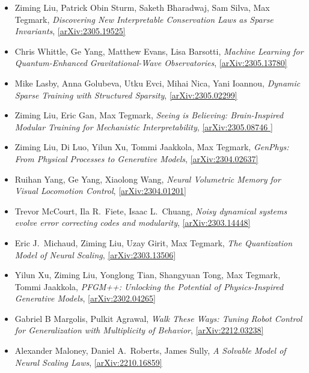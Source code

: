 \begin{itemize}
\item Ziming Liu, Patrick Obin Sturm, Saketh Bharadwaj, Sam Silva, Max Tegmark, \textit{Discovering New Interpretable Conservation Laws as Sparse Invariants}, \href{https://arxiv.org/abs/2305.19525}{[arXiv:2305.19525]} 
\item Chris Whittle, Ge Yang, Matthew Evans, Lisa Barsotti, \textit{Machine Learning for Quantum-Enhanced Gravitational-Wave Observatories}, \href{https://arxiv.org/abs/2305.13780}{[arXiv:2305.13780]} 
\item Mike Lasby, Anna Golubeva, Utku Evci, Mihai Nica, Yani Ioannou, \textit{Dynamic Sparse Training with Structured Sparsity}, \href{https://arxiv.org/abs/2305.02299}{[arXiv:2305.02299]} 
\item Ziming Liu, Eric Gan, Max Tegmark, \textit{Seeing is Believing: Brain-Inspired Modular Training for Mechanistic Interpretability}, \href{https://arxiv.org/abs/2305.08746 }{[arXiv:2305.08746 ]} 
\item Ziming Liu, Di Luo, Yilun Xu, Tommi Jaakkola, Max Tegmark, \textit{GenPhys: From Physical Processes to Generative Models}, \href{https://arxiv.org/abs/2304.02637}{[arXiv:2304.02637]} 
\item Ruihan Yang, Ge Yang, Xiaolong Wang, \textit{Neural Volumetric Memory for Visual Locomotion Control}, \href{https://arxiv.org/abs/2304.01201}{[arXiv:2304.01201]} 
\item Trevor McCourt, Ila R.\  Fiete, Isaac L.\  Chuang, \textit{Noisy dynamical systems evolve error correcting codes and modularity}, \href{https://arxiv.org/abs/2303.14448}{[arXiv:2303.14448]} 
\item Eric J.\  Michaud, Ziming Liu, Uzay Girit, Max Tegmark, \textit{The Quantization Model of Neural Scaling}, \href{https://arxiv.org/abs/2303.13506}{[arXiv:2303.13506]} 
\item Yilun Xu, Ziming Liu, Yonglong Tian, Shangyuan Tong, Max Tegmark, Tommi Jaakkola, \textit{PFGM++: Unlocking the Potential of Physics-Inspired Generative Models}, \href{https://arxiv.org/abs/2302.04265}{[arXiv:2302.04265]} 
\item Gabriel B Margolis, Pulkit Agrawal, \textit{Walk These Ways: Tuning Robot Control for Generalization with Multiplicity of Behavior}, \href{https://arxiv.org/abs/2212.03238}{[arXiv:2212.03238]} 
\item Alexander Maloney, Daniel A.\  Roberts, James Sully, \textit{A Solvable Model of Neural Scaling Laws}, \href{https://arxiv.org/abs/2210.16859}{[arXiv:2210.16859]} 

\end{itemize}
